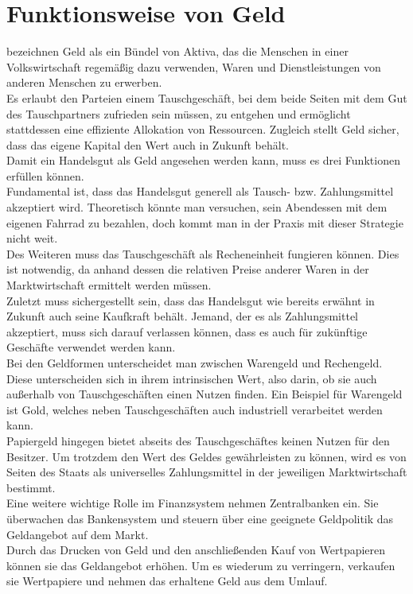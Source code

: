 \section{Funktionsweise von Geld}
\cite{mankiw_taylor_2018} bezeichnen Geld als ein Bündel von Aktiva, das die Menschen in einer Volkswirtschaft regemäßig dazu verwenden, Waren und Dienstleistungen von anderen Menschen zu erwerben.\\
Es erlaubt den Parteien einem Tauschgeschäft, bei dem beide Seiten mit dem Gut des Tauschpartners zufrieden sein müssen, zu entgehen und ermöglicht stattdessen eine effiziente Allokation von Ressourcen. Zugleich stellt Geld sicher, dass das eigene Kapital den Wert auch in Zukunft behält.\\
Damit ein Handelsgut als Geld angesehen werden kann, muss es drei Funktionen erfüllen können.\\
Fundamental ist, dass das Handelsgut generell als Tausch- bzw. Zahlungsmittel akzeptiert wird. Theoretisch könnte man versuchen, sein Abendessen mit dem eigenen Fahrrad zu bezahlen, doch kommt man in der Praxis mit dieser Strategie nicht weit.\\
Des Weiteren muss das Tauschgeschäft als Recheneinheit fungieren können. Dies ist notwendig, da anhand dessen die relativen Preise anderer Waren in der Marktwirtschaft ermittelt werden müssen.\\
Zuletzt muss sichergestellt sein, dass das Handelsgut wie bereits erwähnt in Zukunft auch seine Kaufkraft behält. Jemand, der es als Zahlungsmittel akzeptiert, muss sich darauf verlassen können, dass es auch für zukünftige Geschäfte verwendet werden kann.\\
Bei den Geldformen unterscheidet man zwischen Warengeld und Rechengeld. Diese unterscheiden sich in ihrem intrinsischen Wert, also darin, ob sie auch außerhalb von Tauschgeschäften einen Nutzen finden. Ein Beispiel für Warengeld ist Gold, welches neben Tauschgeschäften auch industriell verarbeitet werden kann.\\
Papiergeld hingegen bietet abseits des Tauschgeschäftes keinen Nutzen für den Besitzer. Um trotzdem den Wert des Geldes gewährleisten zu können, wird es von Seiten des Staats als universelles Zahlungsmittel in der jeweiligen Marktwirtschaft bestimmt.\\
Eine weitere wichtige Rolle im Finanzsystem nehmen Zentralbanken ein. Sie überwachen das Bankensystem und steuern über eine geeignete Geldpolitik das Geldangebot auf dem Markt.\\
Durch das Drucken von Geld und den anschließenden Kauf von Wertpapieren können sie das Geldangebot erhöhen. Um es wiederum zu verringern, verkaufen sie Wertpapiere und nehmen das erhaltene Geld aus dem Umlauf.\\

